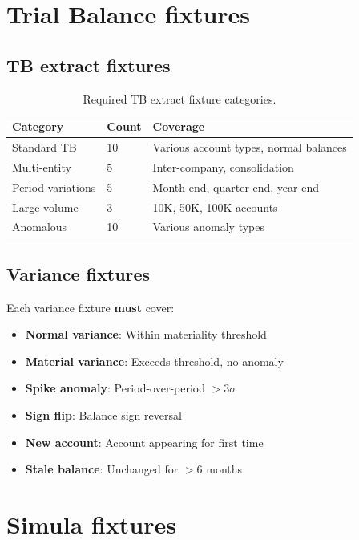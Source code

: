 \section{Trial Balance fixtures}

\subsection{TB extract fixtures}

\begin{table}[htbp]
\centering
\caption{Required TB extract fixture categories.}
\label{tab:tb-fixtures}
\footnotesize
\begin{tabularx}{\linewidth}{@{}l l X@{}}
\toprule
\textbf{Category} & \textbf{Count} & \textbf{Coverage} \\ \midrule
Standard TB & 10 & Various account types, normal balances \\
Multi-entity & 5 & Inter-company, consolidation \\
Period variations & 5 & Month-end, quarter-end, year-end \\
Large volume & 3 & 10K, 50K, 100K accounts \\
Anomalous & 10 & Various anomaly types \\
\bottomrule
\end{tabularx}
\end{table}

\subsection{Variance fixtures}

Each variance fixture \textbf{must} cover:
\begin{itemize}
  \item \textbf{Normal variance}: Within materiality threshold
  \item \textbf{Material variance}: Exceeds threshold, no anomaly
  \item \textbf{Spike anomaly}: Period-over-period $>3\sigma$
  \item \textbf{Sign flip}: Balance sign reversal
  \item \textbf{New account}: Account appearing for first time
  \item \textbf{Stale balance}: Unchanged for $>$6 months
\end{itemize}

\section{Simula fixtures}

